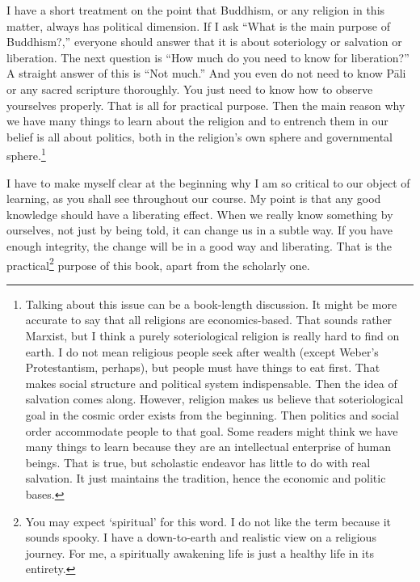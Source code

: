I have a short treatment on the point that Buddhism, or any religion in this matter, always has political dimension. If I ask ``What is the main purpose of Buddhism?,'' everyone should answer that it is about soteriology or salvation or liberation. The next question is ``How much do you need to know for liberation?'' A straight answer of this is ``Not much.'' And you even do not need to know P\=ali or any sacred scripture thoroughly. You just need to know how to observe yourselves properly. That is all for practical purpose. Then the main reason why we have many things to learn about the religion and to entrench them in our belief is all about politics, both in the religion's own sphere and governmental sphere.\footnote{Talking about this issue can be a book-length discussion. It might be more accurate to say that all religions are economics-based. That sounds rather Marxist, but I think a purely soteriological religion is really hard to find on earth. I do not mean religious people seek after wealth (except Weber's Protestantism, perhaps), but people must have things to eat first. That makes social structure and political system indispensable. Then the idea of salvation comes along. However, religion makes us believe that soteriological goal in the cosmic order exists from the beginning. Then politics and social order accommodate people to that goal. Some readers might think we have many things to learn because they are an intellectual enterprise of human beings. That is true, but scholastic endeavor has little to do with real salvation. It just maintains the tradition, hence the economic and politic bases.}

I have to make myself clear at the beginning why I am so critical to our object of learning, as you shall see throughout our course. My point is that any good knowledge should have a liberating effect. When we really know something by ourselves, not just by being told, it can change us in a subtle way. If you have enough integrity, the change will be in a good way and liberating. That is the practical\footnote{You may expect `spiritual' for this word. I do not like the term because it sounds spooky. I have a down-to-earth and realistic view on a religious journey. For me, a spiritually awakening life is just a healthy life in its entirety.} purpose of this book, apart from the scholarly one.

